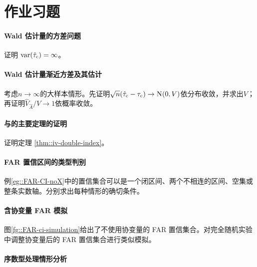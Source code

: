  
\section{作业习题}



 
\paragraph{Wald 估计量的方差问题}\label{problem::infinite-var-iv}

证明 $\textup{var}(\hat{\tau}_{\textup{c}}) = \infty$。 



\paragraph{Wald 估计量渐近方差及其估计}\label{problem::var-iv-estimate}


考虑$n\rightarrow \infty$的大样本情形。先证明$\sqrt{n}(\hat{\tau}_{\textup{c}} - \tau_{\textup{c}}) \rightarrow \textsc{N}(0, V)$依分布收敛，并求出$V$；再证明$\hat{V}_{\hat{A}} /V \rightarrow 1$依概率收敛。 

 
 
 
\paragraph{\citet{imbens1994identification}与\citet{angrist1996identification}的主要定理的证明} 
 \label{para::iv-alternative-form-theorem}
 
 证明定理 \ref{thm::iv-double-index}。 
 


\paragraph{FAR 置信区间的类型判别}\label{para::FAR-CI-cases}

例\ref{eg::FAR-CI-noX}中的置信集合可以是一个闭区间、两个不相连的区间、空集或整条实数轴。分别求出每种情形的确切条件。
 
 
 \paragraph{含协变量 FAR 模拟}\label{para::FAR-CI-simulation-X}

图\ref{fg::FAR-ci-simulation}给出了不使用协变量的 FAR 置信集合。对完全随机实验中调整协变量后的 FAR 置信集合进行类似模拟。 
 
 
\paragraph{序数型处理情形分析}\label{para::iv-ordinal-treatment}


